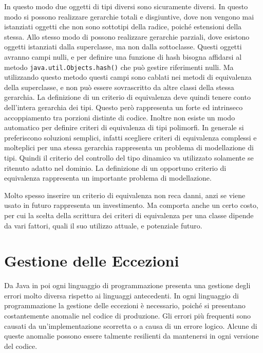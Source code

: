 \documentclass{article}
\numberwithin{equation}{subsection}
\begin{document}
In questo modo due oggetti di tipi diversi sono sicuramente diversi. 
In questo modo si possono realizzare gerarchie totali e disgiuntive, dove non vengono mai istanziati oggetti che non sono sottotipi della radice, poiché estensioni della stessa. 
Allo stesso modo di possono realizzare gerarchie parziali, dove esistono oggetti istanziati dalla superclasse, ma non dalla sottoclasse. Questi oggetti 
avranno campi nulli, e per definire una funzione di hash bisogna affidarsi al metodo \verb|java.util.Objects.hash()| che può gestire riferimenti 
nulli. 
Ma utilizzando questo metodo questi campi sono cablati nei metodi di equivalenza della superclasse, e non può essere sovrascritto da altre classi della 
stessa gerarchia. 
La definizione di un criterio di equivalenza deve quindi tenere conto dell'intera gerarchia dei tipi. Questo però rappresenta un forte ed 
intrinseco accoppiamento tra porzioni distinte di codice. 
Inoltre non esiste un modo automatico per definire criteri di equivalenza di tipi polimorfi. 
In generale si preferiscono soluzioni semplici, infatti scegliere criteri di equivalenza complessi e molteplici per una stessa gerarchia rappresenta un 
problema di modellazione di tipi. Quindi il criterio del controllo del tipo dinamico va utilizzato solamente se ritenuto adatto nel dominio. 
La definizione di un opportuno criterio di equivalenza rappresenta un importante problema di modellazione. 


Molto spesso inserire un criterio di equivalenza non reca danni, anzi se viene usato in futuro rappresenta un investimento. Ma comporta anche un certo costo, per cui la scelta 
della scrittura dei criteri di equivalenza per una classe dipende da vari fattori, quali il suo utilizzo attuale, e potenziale futuro. 

\clearpage

\section{Gestione delle Eccezioni}

Da Java in poi ogni linguaggio di programmazione presenta una gestione degli errori molto diversa rispetto ai linguaggi antecedenti. 
In ogni linguaggio di programmazione la gestione delle eccezioni è necessario, poiché si presentano costantemente anomalie nel codice di produzione.  
Gli errori più frequenti sono causati da un'implementazione scorretta o a causa di un errore logico. Alcune di queste anomalie possono essere talmente resilienti da mantenersi 
in ogni versione del codice. 
\end{document}
